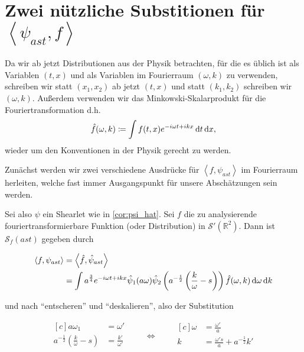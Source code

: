 \section{\texorpdfstring{Zwei nützliche Substitionen für  $\left<\psi_{ast}, f\right>$}{Zwei nützliche Substitutionen}}
\label{sec:substitutionen}

\begin{remark}[Notation]
    Da wir ab jetzt Distributionen aus der Physik betrachten, für die es üblich ist als Variablen $(t, x)$ und als Variablen im Fourierraum $(\omega, k)$ zu verwenden, schreiben wir statt $(x_1, x_2)$ ab jetzt $(t,x)$ und statt $(k_1, k_2)$ schreiben wir $(\omega, k)$. Außerdem verwenden wir das Minkowski-Skalarprodukt für die Fouriertransformation d.h.
    \begin{equation*}
        \hat f (\omega, k) \coloneqq \int f(t,x) e^{-i\omega t + i k x}
        \mathop{}\!\mathrm{d} t \mathop{}\!\mathrm{d} x
        ,
    \end{equation*}
    wieder um den Konventionen in der Physik gerecht zu werden.
\end{remark}

Zunächst werden wir zwei verschiedene Ausdrücke für $\left< f, \psi_{ast} \right>$
im Fourierraum herleiten, welche fast immer Ausgangspunkt für unsere Abschätzungen sein werden.

Sei also $\psi$ ein Shearlet wie in \cref{cor:psi_hat}. Sei $f$ die zu
analysierende fouriertransformierbare Funktion (oder Distribution) in
$\mathcal{S}' (\mathbb{R}^2)$. Dann ist $\mathcal{S}_f (ast)$ gegeben durch

\begin{align*}
\left<f, \psi_{ast}\right> &= \left< \hat f, \hat\psi_{ast}\right> \\
 &= \int a^{\frac{3}{4}} e^{-i \omega t + ikx} \hat \psi_1(a \omega)
    \hat \psi_2 \left(a^{-\frac{1}{2}} \left(\frac{k}{\omega} - s\right)\right)
    \hat f (\omega,k) \mathop{}\!\mathrm{d} \omega \mathop{}\!\mathrm{d} k
\end{align*}

und nach "`entscheren"' und "`deskalieren"', also der Substitution

\begin{equation}
\begin{aligned}[c]
a \omega_1 &= \omega'\\
a^{-\frac{1}{2}} \left(\frac{k}{\omega} - s\right) &=\frac{k'}{\omega'}\\
\end{aligned}
\qquad\Longleftrightarrow\qquad
\begin{aligned}[c]
\omega &= \frac{\omega'}{a}\\
k &= \frac{\omega' s}{a} + a^{-\frac{1}{2}} k'\\
\end{aligned}
\label{eq:substitution1_coords}
\end{equation}

